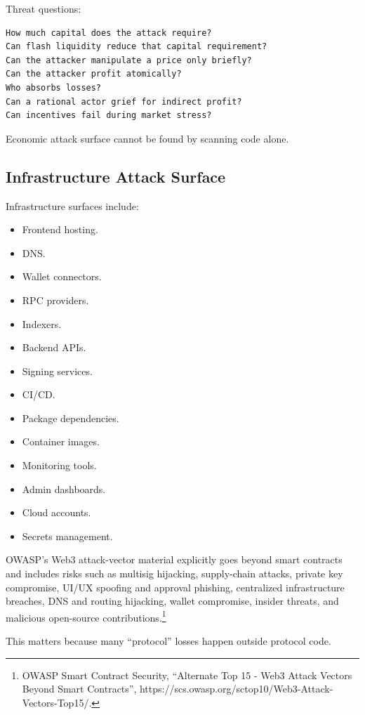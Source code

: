 Threat questions:

\begin{lstlisting}
How much capital does the attack require?
Can flash liquidity reduce that capital requirement?
Can the attacker manipulate a price only briefly?
Can the attacker profit atomically?
Who absorbs losses?
Can a rational actor grief for indirect profit?
Can incentives fail during market stress?
\end{lstlisting}

Economic attack surface cannot be found by scanning code alone.

\subsection{Infrastructure Attack Surface}

Infrastructure surfaces include:

\begin{itemize}
\tightlist
\item
  Frontend hosting.
\item
  DNS.
\item
  Wallet connectors.
\item
  RPC providers.
\item
  Indexers.
\item
  Backend APIs.
\item
  Signing services.
\item
  CI/CD.
\item
  Package dependencies.
\item
  Container images.
\item
  Monitoring tools.
\item
  Admin dashboards.
\item
  Cloud accounts.
\item
  Secrets management.
\end{itemize}

OWASP's Web3 attack-vector material explicitly goes beyond smart
contracts and includes risks such as multisig hijacking, supply-chain
attacks, private key compromise, UI/UX spoofing and approval phishing,
centralized infrastructure breaches, DNS and routing hijacking, wallet
compromise, insider threats, and malicious open-source
contributions.\footnote{OWASP Smart Contract Security, ``Alternate Top
  15 - Web3 Attack Vectors Beyond Smart Contracts'',
  https://scs.owasp.org/sctop10/Web3-Attack-Vectors-Top15/.}

This matters because many ``protocol'' losses happen outside protocol
code.

